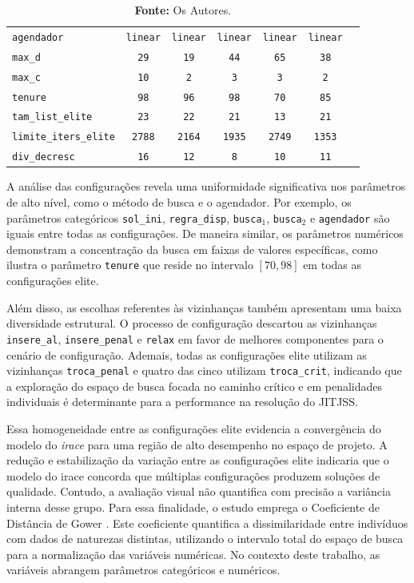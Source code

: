 \begin{table}[ht]
{\begin{tabular}{lcccccc}
\texttt{agendador} & \texttt{linear} & \texttt{linear} & \texttt{linear} & \texttt{linear} & \texttt{linear}  \\ 
\texttt{max\_d} & \texttt{29} & \texttt{19} & \texttt{44} & \texttt{65} & \texttt{38}  \\ 
\texttt{max\_c} & \texttt{10} & \texttt{2} & \texttt{3} & \texttt{3} & \texttt{2}  \\ 
\texttt{tenure} & \texttt{98} & \texttt{96} & \texttt{98} & \texttt{70} & \texttt{85} \\ 
\texttt{tam\_list\_elite} & \texttt{23} & \texttt{22} & \texttt{21} & \texttt{13} & \texttt{21} \\ 
\texttt{limite\_iters\_elite} & \texttt{2788} & \texttt{2164} & \texttt{1935} & \texttt{2749} & \texttt{1353}  \\ 
\texttt{div\_decresc} & \texttt{16} & \texttt{12} & \texttt{8} & \texttt{10} & \texttt{11} \\ 
\hline
\end{tabular}
}
\caption*{\textbf{Fonte:} Os Autores.}
\end{table}

A análise das configurações revela uma uniformidade significativa nos parâmetros de alto nível, como o método de busca e o agendador. Por exemplo, os parâmetros categóricos \texttt{sol\_ini}, \texttt{regra\_disp}, \texttt{busca$_1$}, \texttt{busca$_2$} e \texttt{agendador} são iguais entre todas as configurações. De maneira similar, os parâmetros numéricos demonstram a concentração da busca em faixas de valores específicas, como ilustra o parâmetro \texttt{tenure} que reside no intervalo $[70,98]$ em todas as configurações elite.

Além disso, as escolhas referentes às vizinhanças também apresentam uma baixa diversidade estrutural. O processo de configuração descartou as vizinhanças \texttt{insere\_al}, \texttt{insere\_penal} e \texttt{relax} em favor de melhores componentes para o cenário de configuração. Ademais, todas as configurações elite utilizam as vizinhanças \texttt{troca\_penal} e quatro das cinco utilizam \texttt{troca\_crit}, indicando que a exploração do espaço de busca focada no caminho crítico e em penalidades individuais é determinante para a performance na resolução do \ac{JITJSS}.

Essa homogeneidade entre as configurações elite evidencia a convergência do modelo do \textit{irace} para uma região de alto desempenho no espaço de projeto. A redução e estabilização da variação entre as configurações elite indicaria que o modelo do irace concorda que múltiplas configurações produzem soluções de qualidade. Contudo, a avaliação visual não quantifica com precisão a variância interna desse grupo. Para essa finalidade, o estudo emprega o Coeficiente de Distância de Gower \citep{gower1971general}. Este coeficiente quantifica a dissimilaridade entre indivíduos com dados de naturezas distintas, utilizando o intervalo total do espaço de busca para a normalização das variáveis numéricas. No contexto deste trabalho, as variáveis abrangem parâmetros categóricos e numéricos.

